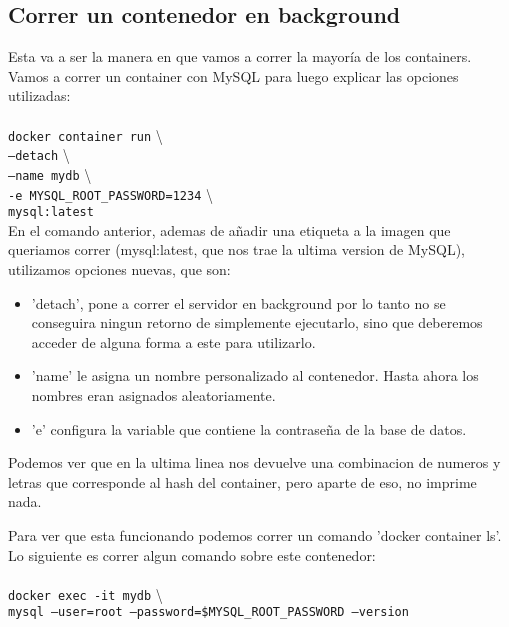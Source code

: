 \documentclass[11pt]{article} %
\begin{document}
\subsection{Correr un contenedor en background}

Esta va a ser la manera en que vamos a correr la mayoría de los containers.\\
Vamos a correr un container con MySQL para luego explicar las opciones utilizadas:\\ \\
		\texttt{docker container run} \textbackslash \\
		\texttt{--detach} \textbackslash \\
		\texttt{--name mydb} \textbackslash \\
		\texttt{-e MYSQL\_ROOT\_PASSWORD=1234} \textbackslash \\
		\texttt{mysql:latest}
	\\

En el comando anterior, ademas de añadir una etiqueta a la imagen que queriamos correr (mysql:latest, que nos trae la ultima version de MySQL), utilizamos opciones nuevas, que son:
\begin{itemize}
	\item 	
 	'detach', pone a correr el servidor en background por lo tanto no se conseguira ningun retorno de simplemente ejecutarlo, sino que deberemos acceder de alguna forma a este para utilizarlo.
 	
 	\item
	'name' le asigna un nombre personalizado al contenedor. Hasta ahora los nombres eran asignados aleatoriamente.
	
	\item
	'e' configura la variable que contiene la contraseña de la base de datos.

\end{itemize}

Podemos ver que en la ultima linea nos devuelve una combinacion de numeros y letras que corresponde al hash del container, pero aparte de eso, no imprime nada.

Para ver que esta funcionando podemos correr un comando 'docker container ls'. Lo siguiente es correr algun comando sobre este contenedor:\\ \\
	\texttt{docker exec -it mydb} \textbackslash \\
	\texttt{mysql --user=root --password=\$MYSQL\_ROOT\_PASSWORD --version}\\
\end{document}
